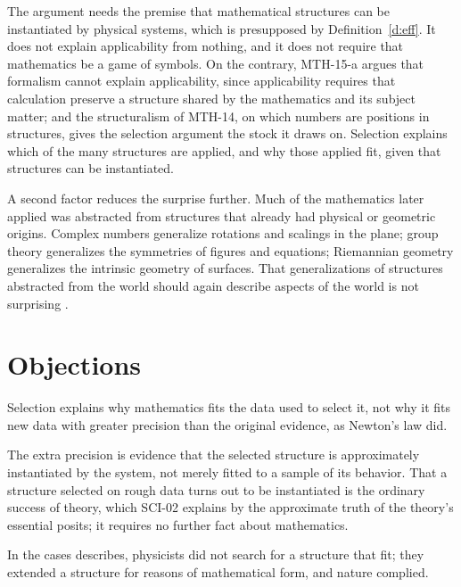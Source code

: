 \documentclass{situationist-preprint}
\begin{document}
The argument needs the premise that mathematical structures can be instantiated by physical systems, which is presupposed by Definition~\ref{d:eff}. It does not explain applicability from nothing, and it does not require that mathematics be a game of symbols. On the contrary, MTH-15-a argues that formalism cannot explain applicability, since applicability requires that calculation preserve a structure shared by the mathematics and its subject matter; and the structuralism of MTH-14, on which numbers are positions in structures, gives the selection argument the stock it draws on. Selection explains which of the many structures are applied, and why those applied fit, given that structures can be instantiated.

A second factor reduces the surprise further. Much of the mathematics later applied was abstracted from structures that already had physical or geometric origins. Complex numbers generalize rotations and scalings in the plane; group theory generalizes the symmetries of figures and equations; Riemannian geometry generalizes the intrinsic geometry of surfaces. That generalizations of structures abstracted from the world should again describe aspects of the world is not surprising \citep{GrattanGuinness2008}.

\section{Objections}

\begin{objection}[Accuracy]
Selection explains why mathematics fits the data used to select it, not why it fits new data with greater precision than the original evidence, as Newton's law did.
\end{objection}

\begin{reply}
The extra precision is evidence that the selected structure is approximately instantiated by the system, not merely fitted to a sample of its behavior. That a structure selected on rough data turns out to be instantiated is the ordinary success of theory, which SCI-02 explains by the approximate truth of the theory's essential posits; it requires no further fact about mathematics.
\end{reply}

\begin{objection}
In the cases \citet{Steiner1998} describes, physicists did not search for a structure that fit; they extended a structure for reasons of mathematical form, and nature complied.
\end{objection}
\end{document}
